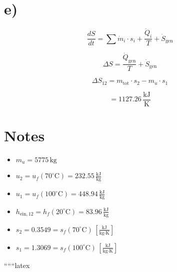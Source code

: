 

\section*{e)}

\begin{equation*}
\frac{dS}{dt} = \sum \dot{m}_i \cdot s_i + \frac{\dot{Q}_i}{T} + \dot{S}_{\text{gen}}
\end{equation*}

\begin{equation*}
\Delta S = \frac{\dot{Q}_{\text{gen}}}{T} + \dot{S}_{\text{gen}}
\end{equation*}

\begin{equation*}
\Delta S_{12} = m_{\text{tot}} \cdot s_2 - m_u \cdot s_1
\end{equation*}

\begin{equation*}
= \boxed{1127.26 \, \frac{\text{kJ}}{\text{K}}}
\end{equation*}

\section*{Notes}

\begin{itemize}
    \item $m_u = 5775 \, \text{kg}$
    \item $u_2 = u_f (70^\circ \text{C}) = 232.55 \, \frac{\text{kJ}}{\text{kg}}$
    \item $u_1 = u_f (100^\circ \text{C}) = 448.94 \, \frac{\text{kJ}}{\text{kg}}$
    \item $h_{\text{ein},12} = h_f (20^\circ \text{C}) = 83.96 \, \frac{\text{kJ}}{\text{kg}}$
    \item $s_2 = 0.3549 = s_f (70^\circ \text{C}) \, \left[ \frac{\text{kJ}}{\text{kg} \cdot \text{K}} \right]$
    \item $s_1 = 1.3069 = s_f (100^\circ \text{C}) \, \left[ \frac{\text{kJ}}{\text{kg} \cdot \text{K}} \right]$
\end{itemize}

``````latex